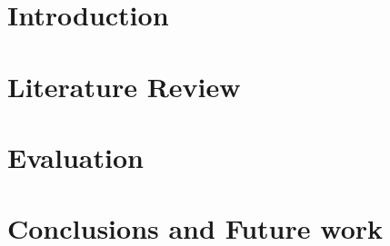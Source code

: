 \documentclass[preprint,12pt]{elsarticle}
\begin{document}
\section{Introduction}
\section{Literature Review}\label{sect:related-work}

\section{Evaluation}\label{sect:evaluation}

\section{Conclusions and Future work}\label{sect:conclusions}

\nocite{*}


\end{document}

